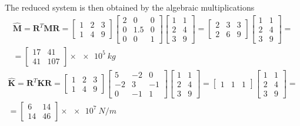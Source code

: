 \begin{Answer}[ref={three_storey_helicopter}]
The reduced system is then obtained by the algebraic multiplications
\begin{multline*}
\hat{\mathbf{M}} = \mathbf{R}^T \mathbf{M} \mathbf{R} =
\begin{bmatrix}
    1 & 2 & 3 \\
    1 & 4 & 9
\end{bmatrix}
\begin{bmatrix}
    2 & 0 & 0 \\
    0 & 1.5 & 0 \\
    0 & 0 & 1
\end{bmatrix}
\begin{bmatrix}
    1 & 1 \\
    2 & 4 \\
    3 & 9
\end{bmatrix} =
\begin{bmatrix}
    2 & 3 & 3 \\
    2 & 6 & 9
\end{bmatrix}
\begin{bmatrix}
    1 & 1 \\
    2 & 4 \\
    3 & 9
\end{bmatrix} = \\
= \begin{bmatrix}
    17 & 41 \\
    41 & 107
\end{bmatrix} \times \SI{e5}{kg}
\end{multline*}
\begin{multline*}
\hat{\mathbf{K}} = \mathbf{R}^T \mathbf{K} \mathbf{R} =
\begin{bmatrix}
    1 & 2 & 3 \\
    1 & 4 & 9
\end{bmatrix}
\begin{bmatrix}
    5 & -2 & 0 \\
    -2 & 3 & -1 \\
    0 & -1 & 1
\end{bmatrix}
\begin{bmatrix}
    1 & 1 \\
    2 & 4 \\
    3 & 9
\end{bmatrix} =
\begin{bmatrix}
    1 & 1 & 1
\end{bmatrix}
\begin{bmatrix}
    1 & 1 \\
    2 & 4 \\
    3 & 9
\end{bmatrix} = \\
= \begin{bmatrix}
    6 & 14 \\
    14 & 46
\end{bmatrix} \times \SI{e7}{N/m}
\end{multline*}


\end{Answer}
